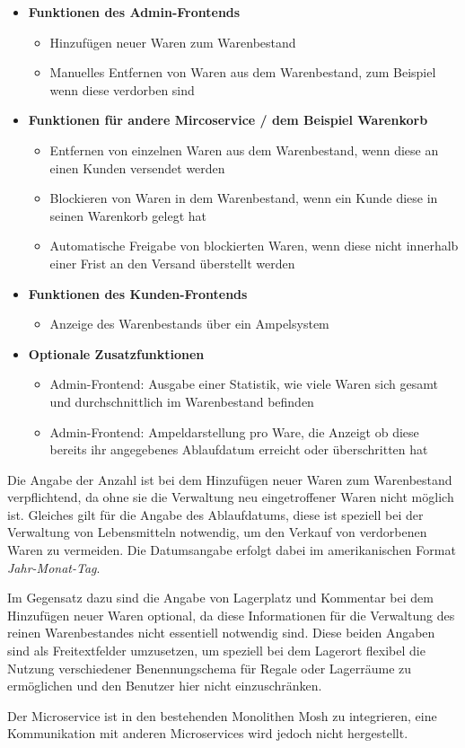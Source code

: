 \begin{itemize}
	\item \textbf{Funktionen des Admin-Frontends}
	\begin{itemize}
		\item Hinzufügen neuer Waren zum Warenbestand
		\item Manuelles Entfernen von Waren aus dem Warenbestand, zum Beispiel wenn diese verdorben sind
	\end{itemize}
	\item \textbf{Funktionen für andere Mircoservice / dem Beispiel Warenkorb}
	\begin{itemize}
		\item Entfernen von einzelnen Waren aus dem Warenbestand, wenn diese an einen Kunden versendet werden
		\item Blockieren von Waren in dem Warenbestand, wenn ein Kunde diese in seinen Warenkorb gelegt hat
		\item Automatische Freigabe von blockierten Waren, wenn diese nicht innerhalb einer Frist an den Versand überstellt werden
	\end{itemize}
	\item \textbf{Funktionen des Kunden-Frontends}
	\begin{itemize}
		\item Anzeige des Warenbestands über ein Ampelsystem
	\end{itemize}
	\item \textbf{Optionale Zusatzfunktionen}
	\begin{itemize}
		\item Admin-Frontend: Ausgabe einer Statistik, wie viele Waren sich gesamt und durchschnittlich im Warenbestand befinden
		\item Admin-Frontend: Ampeldarstellung pro Ware, die Anzeigt ob diese bereits ihr angegebenes Ablaufdatum erreicht oder überschritten hat
	\end{itemize}
\end{itemize}
\newpage
Die Angabe der Anzahl ist bei dem Hinzufügen neuer Waren zum Warenbestand verpflichtend, da ohne sie die Verwaltung neu eingetroffener Waren nicht möglich ist. Gleiches gilt für die Angabe des Ablaufdatums, diese ist speziell bei der Verwaltung von Lebensmitteln notwendig, um den Verkauf von verdorbenen Waren zu vermeiden. Die Datumsangabe erfolgt dabei im amerikanischen Format \textit{Jahr-Monat-Tag}. \par
Im Gegensatz dazu sind die Angabe von Lagerplatz und Kommentar bei dem Hinzufügen neuer Waren optional, da diese Informationen für die Verwaltung des reinen Warenbestandes nicht essentiell notwendig sind. Diese beiden Angaben sind als Freitextfelder umzusetzen, um speziell bei dem Lagerort flexibel die Nutzung verschiedener Benennungschema für Regale oder Lagerräume zu ermöglichen und den Benutzer hier nicht einzuschränken. \par
Der Microservice ist in den bestehenden Monolithen Mosh zu integrieren, eine Kommunikation mit anderen Microservices wird jedoch nicht hergestellt.

